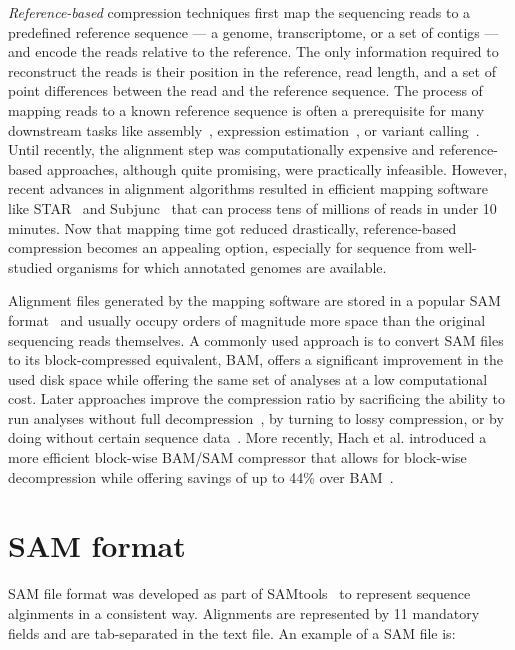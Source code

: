 \documentclass[12pt]{cmuthesis}
\makeatletter
\newcommand{\etal}{et al.\@\xspace}
\makeatother
\begin{document}

  \textit{Reference-based} compression techniques first map the sequencing reads to a predefined reference sequence --- a genome, transcriptome, or a set of contigs --- and encode the reads relative to the reference. The only information required to reconstruct the reads is their position in the reference, read length, and a set of point differences between the read and the reference sequence. The process of mapping reads to a known reference sequence is often a prerequisite for many downstream tasks like assembly~\cite{Assembly}, expression estimation~\cite{Cufflinks,RSEM}, or variant calling~\cite{GATK}. Until recently, the alignment step was computationally expensive and reference-based approaches, although quite promising, were practically infeasible. However, recent advances in alignment algorithms resulted in efficient mapping software like STAR~\cite{DobinSTAR} and Subjunc~\cite{Subread} that can process tens of millions of reads in under 10 minutes. Now that mapping time got reduced drastically, reference-based compression becomes an appealing option, especially for sequence from well-studied organisms for which annotated genomes are available.

  Alignment files generated by the mapping software are stored in a popular SAM format~\cite{SamTools} and usually occupy orders of magnitude more space than the original sequencing reads themselves. A commonly used approach is to convert SAM files to its block-compressed equivalent, BAM, offers a significant improvement in the used disk space while offering the same set of analyses at a low computational cost. Later approaches improve the compression ratio by sacrificing the ability to run analyses without full decompression~\cite{Goby,Jones2012}, by turning to lossy compression, or by doing without certain sequence data~\cite{SlimGene,CRAM}. More recently, Hach \etal introduced a more efficient block-wise BAM/SAM compressor that allows for block-wise decompression while offering savings of up to 44\% over BAM~\cite{Sahinalp2015}.

\section{SAM format}

  SAM file format was developed as part of SAMtools~\cite{SamTools} to represent sequence alginments in a consistent way. Alignments are represented by 11 mandatory fields and are tab-separated in the text file. An example of a SAM file is:
\end{document}

